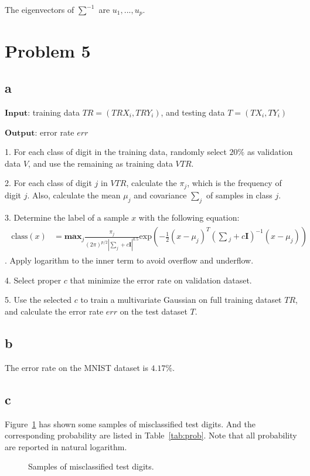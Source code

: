 \documentclass[a4paper,11pt]{article}
\theoremstyle{mytheor}
\begin{document}
The eigenvectors of $\sum^{-1}$ are $u_1, ..., u_p$.

\section*{Problem 5}
\subsection*{a}

$\mathbf{Input}$: training data $TR = (TRX_i, TRY_i)$, and testing data $T = (TX_i, TY_i)$

$\mathbf{Output}$: error rate $err$

1. For each class of digit in the training data, randomly select $20\%$ as validation data $V$, and use the remaining as training data $VTR$.

2. For each class of digit $j$ in $VTR$, calculate the $\pi_j$, which is the frequency of digit $j$. Also, calculate the mean $\mu_j$ and covariance $\sum_{j}$ of samples in class $j$.

3. Determine the label of a sample $x$ with the following equation:
\begin{align}
	\begin{split}
	\text{class}(x) &= \mathbf{max}_{j} \frac{\pi_j}{(2\pi)^{p/2} |\sum_j + c\mathbf{I}|^{0.5}}
	\text{exp}(-\frac{1}{2} (x - \mu_j)^T (\sum{}_j + c\mathbf{I})^{-1} (x - \mu_j))
	\end{split}
\end{align}.
Apply logarithm to the inner term to avoid overflow and underflow.

4. Select proper $c$ that minimize the error rate on validation dataset.

5. Use the selected $c$ to train a multivariate Gaussian on full training dataset $TR$, and calculate the error rate $err$ on the test dataset $T$.

\subsection*{b}
The error rate on the MNIST dataset is $4.17\%$.

\subsection*{c}
Figure~\ref{fig:wrong} has shown some samples of misclassified test digits. And the corresponding probability are listed in Table~\ref{tab:prob}. Note that all
probability are reported in natural logarithm.
\begin{figure}[h]
	\caption{Samples of misclassified test digits.}
	\label{fig:wrong}
\end{figure}
\end{document}
